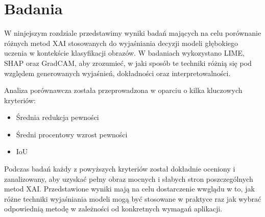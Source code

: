 
\chapter*{Badania}

W ninjejszym rozdziale przedstawimy wyniki badań mających na celu porównanie różnych metod XAI stosowanych do wyjaśniania decyzji modeli głębokiego uczenia w kontekście klasyfikacji obrazów.
W badaniach wykozystano LIME, SHAP oraz GradCAM, aby zrozumieć, w jaki sposób te techniki różnią się pod względem generowanych wyjaśnień, dokładności oraz interpretowalności.

Analiza porównawcza została przeprowadzona w oparciu o kilka kluczowych kryteriów:
\begin{itemize}
	\item Średnia redukcja pewności
	\item Średni procentowy wzrost pewności
	\item IoU
\end{itemize}
Podczas badań każdy z powyższych kryteriów został dokładnie oceniony i zanalizowany, aby uzyskać pełny obraz mocnych i słabych stron poszczególnych metod XAI.
Przedstawione wyniki mają na celu dostarczenie wwglądu w to, jak różne techniki wyjaśniania modeli mogą być stosowane w praktyce raz jak wybrać odpowiednią metodę w zależności od konkretnych wymagań aplikacji.







%

%


